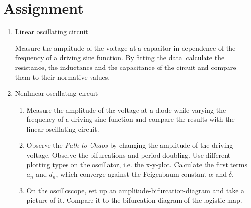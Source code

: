 \section{Assignment}

\begin{enumerate}
\item Linear oscillating circuit

Measure the amplitude of the voltage at a capacitor in dependence of the frequency of a driving sine function. By fitting the data, calculate the resistance, the inductance and the capacitance of the circuit and compare them to their normative values.

\item Nonlinear oscillating circuit 

\begin{enumerate}

\item Measure the amplitude of the voltage at a diode while varying the frequency of a driving sine function and compare the results with the linear oscillating circuit.
\item Observe the \emph{Path to Chaos} by changing the amplitude of the driving voltage. Observe the bifurcations and period doubling. Use different plotting types on the oscillator, i.e. the x-y-plot. Calculate the first terms $a_n$ and $d_n$, which converge against the Feigenbaum-constant $\alpha$ and $\delta$.
\item On the oscilloscope, set up an amplitude-bifurcation-diagram and take a picture of it. Compare it to the bifurcation-diagram of the logistic map.

\end{enumerate}
\end{enumerate}